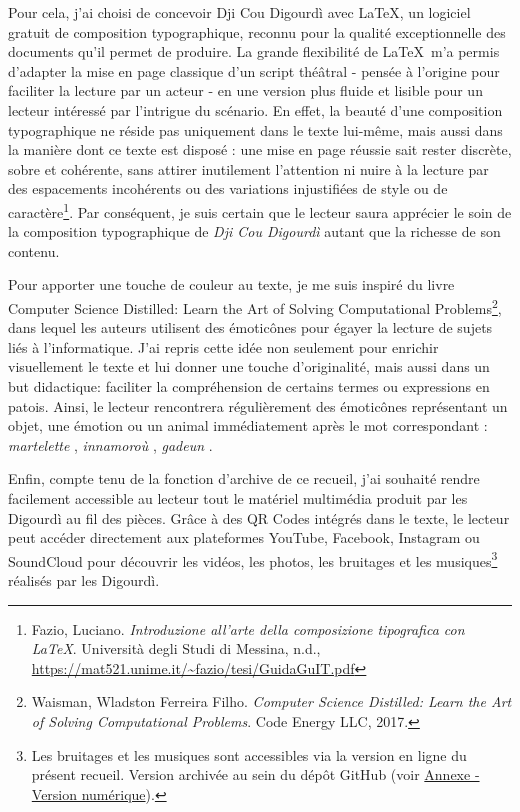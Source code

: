Pour cela, j'ai choisi de concevoir Dji Cou Digourdì avec \LaTeX, un logiciel gratuit de composition typographique, reconnu pour la qualité exceptionnelle des documents qu’il permet de produire. La grande flexibilité de \LaTeX\ m’a permis d’adapter la mise en page classique d’un script théâtral - pensée à l’origine pour faciliter la lecture par un acteur - en une version plus fluide et lisible pour un lecteur intéressé par l’intrigue du scénario. En effet, la beauté d’une composition typographique ne réside pas uniquement dans le texte lui-même, mais aussi dans la manière dont ce texte est disposé : une mise en page réussie sait rester discrète, sobre et cohérente, sans attirer inutilement l’attention ni nuire à la lecture par des espacements incohérents ou des variations injustifiées de style ou de caractère\footnote{ Fazio, Luciano. \textit{Introduzione all'arte della composizione tipografica con LaTeX}. Università degli Studi di Messina, n.d., \url{https://mat521.unime.it/~fazio/tesi/GuidaGuIT.pdf}}. Par conséquent, je suis certain que le lecteur saura apprécier le soin de la composition typographique de \textit{Dji Cou Digourdì} autant que la richesse de son contenu.

Pour apporter une touche de couleur au texte, je me suis inspiré du livre \og Computer Science Distilled: Learn the Art of Solving Computational Problems\fg\footnote{ Waisman, Wladston Ferreira Filho. \textit{Computer Science Distilled: Learn the Art of Solving Computational Problems}. Code Energy LLC, 2017.}, dans lequel les auteurs utilisent des émoticônes pour égayer la lecture de sujets liés à l'informatique. J'ai repris cette idée non seulement pour enrichir visuellement le texte et lui donner une touche d'originalité, mais aussi dans un but didactique: faciliter la compréhension de certains termes ou expressions en patois. Ainsi, le lecteur rencontrera régulièrement des émoticônes représentant un objet, une émotion ou un animal immédiatement après le mot correspondant : \textit{martelette} \martello, \textit{innamoroù} \inamourou, \textit{gadeun} \gadeun.

Enfin, compte tenu de la fonction d'archive de ce recueil, j'ai souhaité rendre facilement accessible au lecteur tout le matériel multimédia produit par les Digourdì au fil des pièces. Grâce à des QR Codes intégrés dans le texte, le lecteur peut accéder directement aux plateformes \mbox{YouTube}, Facebook, Instagram ou SoundCloud pour découvrir les vidéos, les photos, les bruitages et les musiques\footnote{ Les bruitages et les musiques sont accessibles via la version en ligne du présent recueil. Version archivée au sein du dépôt GitHub (voir \hyperref[vers_num]{Annexe - Version numérique}).} réalisés par les Digourdì.


